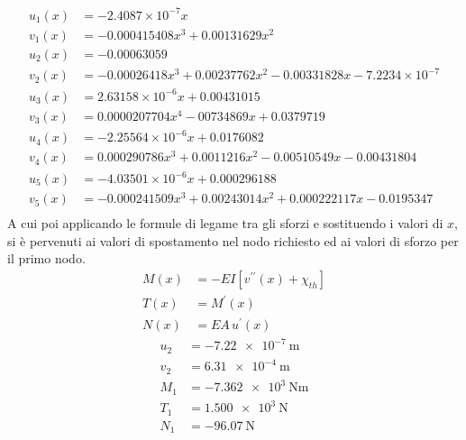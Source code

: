 {\footnotesize{
\begin{align*}
     u_1(x) &= -2.4087\times10^{-7}x\\
     v_1(x) &= -0.000415408 x^3 + 0.00131629 x^2 \\
     u_2(x) &= -0.00063059\\
     v_2(x) &= -0.00026418 x^3 +0.00237762 x^2-0.00331828 x-7.2234\times10^{-7}\\
     u_3(x) &= 2.63158 \times10^{-6}x +0.00431015\\
     v_3(x) &= 0.0000207704 x^4 -00734869x + 0.0379719\\
     u_4(x) &= -2.25564\times10^{-6} x+0.0176082\\
     v_4(x) &= 0.000290786 x^3+0.0011216 x^2-0.00510549 x-0.00431804\\
     u_5(x) &= -4.03501\times10^{-6} x+0.000296188\\
     v_5(x) &= -0.000241509 x^3+0.00243014 x^2 +0.000222117 x-0.0195347\\
\end{align*}}}
A cui poi applicando le formule di legame tra gli sforzi e sostituendo i valori di $x$, si è pervenuti ai valori di spostamento nel nodo richiesto ed ai valori di sforzo per il primo nodo. 
\begin{align*}
    M(x) &= -EI \left[v^{\prime\prime}(x) + \chi_{th}\right] \\
    T(x) &= M^\prime(x) \\
    N(x) &= EA \, u^\prime (x)
\end{align*}
\begin{align*}
    u_2 &= \SI{-7.22e-7}{\meter}\\
    v_2 &= \SI{6.31e-4}{\meter}\\
    M_1 &= \SI{-7.362e3}{\newton\meter}\\
    T_1 &= \SI{1.500e3}{\newton}\\
    N_1 &= \SI{-96.07}{\newton}\\
\end{align*}

